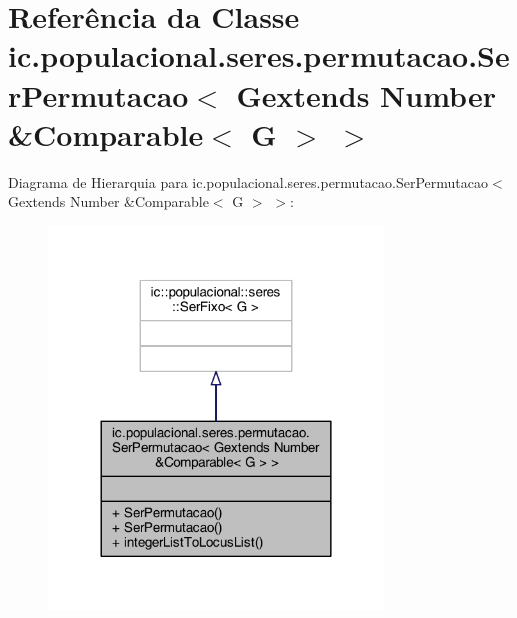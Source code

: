 \hypertarget{classic_1_1populacional_1_1seres_1_1permutacao_1_1_ser_permutacao_3_01_gextends_01_number_01_6_comparable_3_01_g_01_4_01_4}{\section{Referência da Classe ic.\-populacional.\-seres.\-permutacao.\-Ser\-Permutacao$<$ Gextends Number \&Comparable$<$ G $>$ $>$}
\label{classic_1_1populacional_1_1seres_1_1permutacao_1_1_ser_permutacao_3_01_gextends_01_number_01_6_comparable_3_01_g_01_4_01_4}
}


Diagrama de Hierarquia para ic.\-populacional.\-seres.\-permutacao.\-Ser\-Permutacao$<$ Gextends Number \&Comparable$<$ G $>$ $>$\-:
\nopagebreak
\begin{figure}[H]
\begin{center}
\leavevmode
\includegraphics[width=252pt]{classic_1_1populacional_1_1seres_1_1permutacao_1_1_ser_permutacao_3_01_gextends_01_number_01_6_c1c00641f8030e7958f1448bfe56ba52a}
\end{center}
\end{figure}


